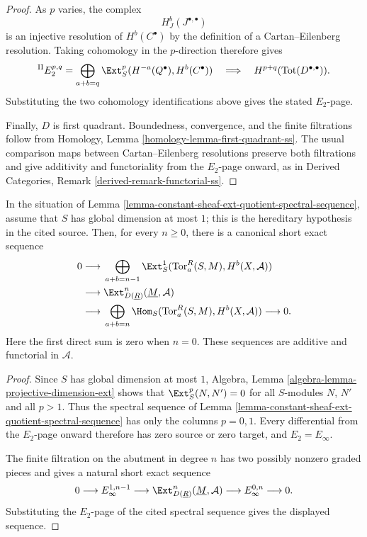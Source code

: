 \begin{proof}
As $p$ varies, the complex
$$
H_J^b(J^{\bullet, \bullet})
$$
is an injective resolution of $H^b(C^\bullet)$ by the definition of a
Cartan--Eilenberg resolution. Taking cohomology in the $p$-direction
therefore gives
$$
{}^{\mathrm{II}}E_2^{p, q} =
\bigoplus_{a + b = q}
\Ext_S^p(H^{-a}(Q^\bullet), H^b(C^\bullet))
\quad\Longrightarrow\quad
H^{p + q}(\text{Tot}(D^{\bullet, \bullet})).
$$
Substituting the two cohomology identifications above gives the stated
$E_2$-page.

Finally, $D$ is first quadrant. Boundedness, convergence, and the finite
filtrations follow from Homology, Lemma
\ref{homology-lemma-first-quadrant-ss}. The usual comparison maps
between Cartan--Eilenberg resolutions preserve both filtrations and give
additivity and functoriality from the $E_2$-page onward, as in Derived
Categories, Remark
\ref{derived-remark-functorial-ss}.
\end{proof}


\begin{lemma}
\label{lemma-constant-sheaf-ext-hereditary-quotient}
\begin{reference}
\cite[Chapter IV, \S 4.3, p. 192]{Tohoku}
\end{reference}
In the situation of
Lemma \ref{lemma-constant-sheaf-ext-quotient-spectral-sequence}, assume
that $S$ has global dimension at most $1$; this is the hereditary
hypothesis in the cited source. Then, for every $n \geq 0$, there is a
canonical short exact sequence
$$
\begin{aligned}
0 \longrightarrow{}&
\bigoplus_{a + b = n - 1}
\Ext_S^1(\text{Tor}_a^R(S, M), H^b(X, \mathcal{A})) \\
\longrightarrow{}&
\Ext^n_{D(\underline{R})}(\underline{M}, \mathcal{A}) \\
\longrightarrow{}&
\bigoplus_{a + b = n}
\Hom_S(\text{Tor}_a^R(S, M), H^b(X, \mathcal{A}))
\longrightarrow 0.
\end{aligned}
$$
Here the first direct sum is zero when $n = 0$. These sequences are
additive and functorial in $\mathcal{A}$.
\end{lemma}

\begin{proof}
Since $S$ has global dimension at most $1$, Algebra, Lemma
\ref{algebra-lemma-projective-dimension-ext} shows that
$\Ext_S^p(N, N') = 0$ for all $S$-modules $N$, $N'$ and all $p > 1$.
Thus the spectral sequence of
Lemma \ref{lemma-constant-sheaf-ext-quotient-spectral-sequence} has only
the columns $p = 0, 1$. Every differential from the $E_2$-page onward
therefore has zero source or zero target, and $E_2 = E_\infty$.

The finite filtration on the abutment in degree $n$ has two possibly
nonzero graded pieces and gives a natural short exact sequence
$$
0 \longrightarrow E_\infty^{1, n - 1}
\longrightarrow
\Ext^n_{D(\underline{R})}(\underline{M}, \mathcal{A})
\longrightarrow E_\infty^{0, n} \longrightarrow 0.
$$
Substituting the $E_2$-page of the cited spectral sequence gives the
displayed sequence.
\end{proof}

